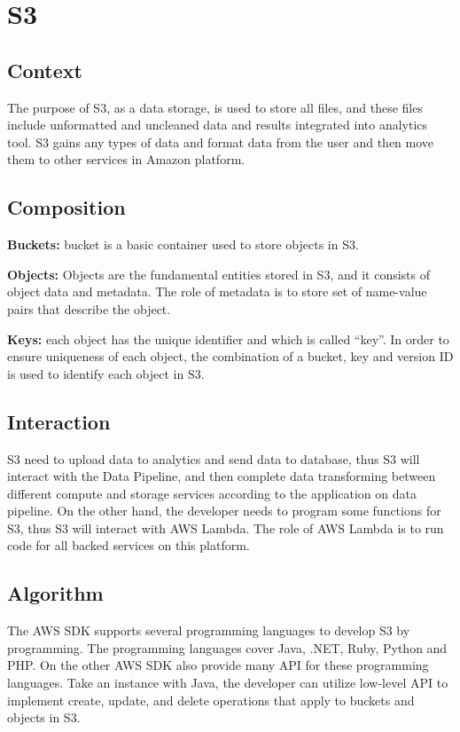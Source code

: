 \section{S3}
	\subsection{Context}
	The purpose of S3, as a data storage, is used to store all files, and these files include unformatted and uncleaned data and results integrated into analytics tool. S3 gains any types of data and format data from the user and then move them to other services in Amazon platform.
        
	\subsection{Composition}
	\textbf{Buckets:} bucket is a basic container used to store objects in S3.\cite{z1}
     
    \noindent \textbf{Objects:} Objects are the fundamental entities stored in S3, and it consists of object data and metadata. The role of metadata is to store set of name-value pairs that describe the object.\cite{z1}
        
	\noindent \textbf{Keys:} each object has the unique identifier and which is called “key”. In order to ensure uniqueness of each object, the combination of a bucket, key and version ID is used to identify each object in S3.\cite{z1}
    
	\subsection{Interaction}
    S3 need to upload data to analytics and send data to database, thus S3 will interact with the Data Pipeline, and then complete data transforming between different compute and storage services according to the application on data pipeline. On the other hand, the developer needs to program some functions for S3, thus S3 will interact with AWS Lambda. The role of AWS Lambda is to run code for all backed services on this platform.
    
	\subsection{Algorithm}
    The AWS SDK supports several programming languages to develop S3 by programming. The programming languages cover Java, .NET, Ruby, Python and PHP. On the other AWS SDK also provide many API for these programming languages. Take an instance with Java, the developer can utilize low-level API to implement create, update, and delete operations that apply to buckets and objects in S3.\cite{z2} 

